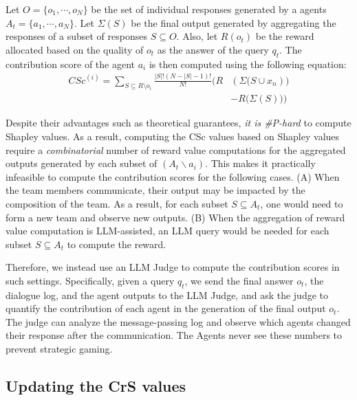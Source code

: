 Let $O=\{o_1,\cdots,o_N\}$ be the set of individual responses generated by a agents $A_t = \{a_1,\cdots,a_N\}$.
Let $\Sigma(S)$ be the final output generated by aggregating the responses of a subset of responses $S\subseteq O$.
Also, let $R(o_t)$ be the reward allocated based on the quality of $o_t$ as the answer of the query $q_t$.
The contribution score of the agent $a_i$ is then computed using the following equation:
\begin{align*}
 CSc^{(i)} =
\sum_{S\subseteq R\setminus{o_i}} \tfrac{|S|!(N-|S|-1)!}{N!}\Big(R&(\Sigma\big(S\cup{x_n})\big)\\
&-R\big(\Sigma(S)\big)\Big)
\end{align*}

\vspace{-3mm}
Despite their advantages such as theoretical guarantees, {\em it is \#P-hard} to compute Shapley values. As a result, computing the CSc values based on Shapley values require a {\em combinatorial} number of reward value computations for the aggregated outputs generated by each subset of $(A_t\backslash a_i)$.
This makes it practically infeasible to compute the contribution scores for the following cases.
(A) When the team members communicate, their output may be impacted by the composition of the team. As a result, for each subset $S\subseteq A_t$, one would need to form a new team and observe new outputs.
(B) When the aggregation of reward value computation is LLM-assisted, an LLM query would be needed for each subset $S\subseteq A_t$ to compute the reward.

Therefore, we instead use an LLM Judge to compute the contribution scores in such settings.
Specifically, given a query $q_t$,
we send the final answer $o_t$, the dialogue log, and the agent outputs to the LLM Judge, and ask the judge to quantify the contribution of each agent in the generation of the final output $o_t$.
The judge can analyze the message-passing log and observe which agents changed their response after the communication. The Agents never see these numbers to prevent strategic gaming.


\subsection{Updating the CrS values}  

